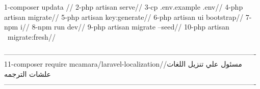 1-composer updata //
2-php artisan serve//
3-cp .env.example .env//
4-php artisan migrate//
5-php artisan key:generate//
6-php artisan ui bootstrap//
7-npm i//
8-npm run dev//
9-php artisan migrate --seed//
10-php artisan  migrate:fresh//

----------------------------------------------------------------------------------------------------------
11-composer require mcamara/laravel-localization//مسئول علي تنزيل اللغات علشات الترجمه 
----------------------------------------------------------------------------------------------------------


